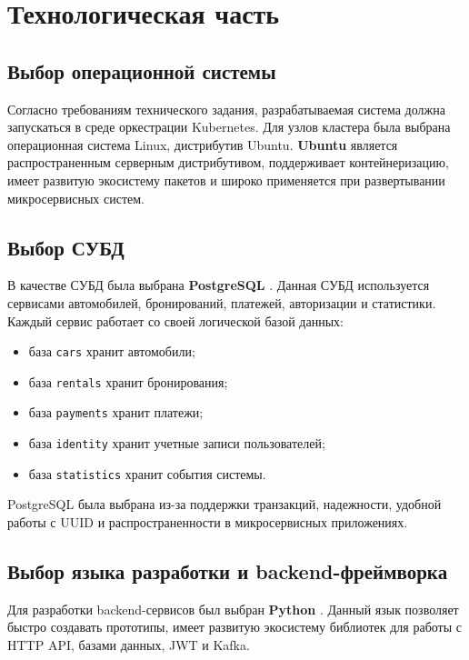 \chapter{Технологическая часть}

\section{Выбор операционной системы}

Согласно требованиям технического задания, разрабатываемая система должна запускаться в среде оркестрации Kubernetes. Для узлов кластера была выбрана операционная система Linux, дистрибутив Ubuntu. \textbf{Ubuntu} \cite{ubuntu} является распространенным серверным дистрибутивом, поддерживает контейнеризацию, имеет развитую экосистему пакетов и широко применяется при развертывании микросервисных систем.

\section{Выбор СУБД}

В качестве СУБД была выбрана \textbf{PostgreSQL} \cite{postgresql}. Данная СУБД используется сервисами автомобилей, бронирований, платежей, авторизации и статистики. Каждый сервис работает со своей логической базой данных:

\begin{itemize}
  \item база \texttt{cars} хранит автомобили;
  \item база \texttt{rentals} хранит бронирования;
  \item база \texttt{payments} хранит платежи;
  \item база \texttt{identity} хранит учетные записи пользователей;
  \item база \texttt{statistics} хранит события системы.
\end{itemize}

PostgreSQL была выбрана из-за поддержки транзакций, надежности, удобной работы с UUID и распространенности в микросервисных приложениях.

\section{Выбор языка разработки и backend-фреймворка}

Для разработки backend-сервисов был выбран \textbf{Python} \cite{python}. Данный язык позволяет быстро создавать прототипы, имеет развитую экосистему библиотек для работы с HTTP API, базами данных, JWT и Kafka.


